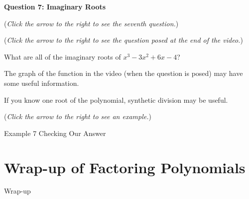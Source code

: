 \documentclass{ximera}
\begin{document}
\textbf{Question 7: Imaginary Roots}
\begin{question}
\begin{flushright}
{\color{blue}(\emph{Click the arrow to the right to see the seventh question.})}
\end{flushright}
\begin{center}
\begin{expandable}
{\color{blue}(\emph{Click the arrow to the right to see the  question
posed at the end of the video.})}
\begin{expandable}
What are all of the imaginary roots of $x^3 - 3x^2 + 6x - 4$?
\begin{multipleChoice}
\end{multipleChoice}
\begin{hint}
The graph of the function in the video (when the question is posed)
may have some useful information.
\end{hint}
\begin{hint}
If you know one root of the polynomial, synthetic division may be useful.
\end{hint}
\begin{flushright}
{\color{blue}(\emph{Click the arrow to the right to see an example.})}
\end{flushright}
\begin{expandable}
Example 7
Checking Our Answer %
\end{expandable}
\end{expandable}
\end{expandable}
\end{center}
\end{question}


\section{Wrap-up of Factoring Polynomials}

\begin{expandable}
Wrap-up
\end{expandable}
\end{document}
